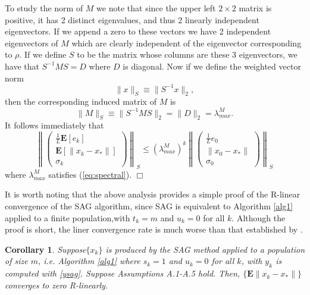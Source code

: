 \documentclass[11pt]{article}
\newtheorem{cor}[thm]{Corollary}
\newcommand{\E}{\mathbf{E}}
\begin{document}
To study the norm of $M$ we note that since the upper left $2 \times 2$ matrix is positive, it has 2 distinct eigenvalues, and thus 2 linearly independent eigenvectors. If we append a zero to these vectors we have 2 independent eigenvectors of $M$ which are clearly independent of the eigenvector corresponding to $\rho$.  If we define $S$ to be the matrix whose columns are these 3 eigenvectors, we have that $S^{-1}MS =D$ where $D$ is diagonal. Now if we define the weighted vector norm 
\[ \|x\|_S \equiv \|S^{-1}x\|_2 ,  \]
then the corresponding induced matrix of $M$ is
\[
\|M\|_S \equiv  \| S^{-1}MS\|_2 = \|D\|_2= \lambda_{max}^M.
\]
It follows immediately that
\begin{equation}\label{rconv}
\left\| \begin{pmatrix} \frac{1}{L}\E[e_k]\\ \E[\|x_k-x_\ast \|] \\ \sigma_k \end{pmatrix} \right\|_S
\leq  (\lambda_{max}^M)^k
 \left\| \begin{pmatrix} \frac{1}{L}e_0 \\ \| x_0-x_\ast \| \\ \sigma_0 \end{pmatrix} \right\|_S
\end{equation}
where $ \lambda_{max}^M$ satisfies (\ref{eq:spectral}).
\hspace*{\fill}$\Box$\medskip

\bigskip

It is worth noting that the above analysis provides a simple proof of the R-linear convergence of the SAG algorithm, since SAG 
is equivalent to Algorithm \ref{alg1} applied to a finite population,with $t_k =m$ and $u_k=0$ for all $k$.  Although the proof is short, the liner convergence rate is much worse than that established by \cite{roux2012stochastic}.

\begin{cor}\label{thm:sag}
Suppose$\{x_k\}$ is produced by the SAG method applied to a population of size $m$, i.e. Algorithm \ref{alg1} where $s_k=1$ and $u_k=0$ for all $k$, with  $y_k$ is computed with \eqref{ysag}.
 Suppose Assumptions A.1-A.5 hold.  Then, $\{\E\|x_k-x_\ast\|\}$  converges to zero R-linearly.
\end{cor}
\end{document}
